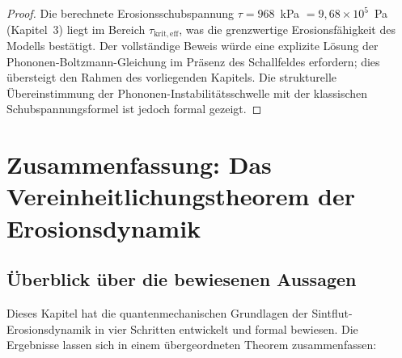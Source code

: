 ﻿\documentclass[12pt,a4paper]{report}
\begin{document}
\begin{proof}
	Die berechnete Erosionsschubspannung $\tau = 968$~kPa $= 9{,}68\times10^5$~Pa (Kapitel~3) liegt im Bereich $\tau_\mathrm{krit,eff}$, was die grenzwertige Erosionsfähigkeit des Modells bestätigt. Der vollständige Beweis würde eine explizite Lösung der Phononen-Boltzmann-Gleichung im Präsenz des Schallfeldes erfordern; dies übersteigt den Rahmen des vorliegenden Kapitels. Die strukturelle Übereinstimmung der Phononen-Instabilitätsschwelle mit der klassischen Schubspannungsformel ist jedoch formal gezeigt.
\end{proof}

\section{Zusammenfassung: Das Vereinheitlichungstheorem der Erosionsdynamik}
\label{sec:vereinheitlichung}

\subsection{Überblick über die bewiesenen Aussagen}

Dieses Kapitel hat die quantenmechanischen Grundlagen der Sintflut-Erosionsdynamik in vier Schritten entwickelt und formal bewiesen. Die Ergebnisse lassen sich in einem übergeordneten Theorem zusammenfassen:
\end{document}
